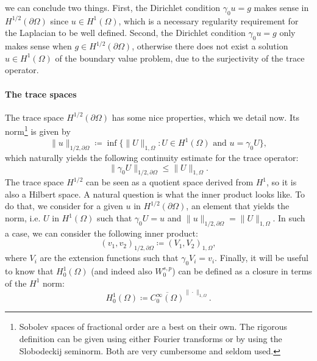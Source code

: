 we can conclude two things. First, the Dirichlet condition $\gamma_0 u = g$ makes sense in $H^{1/2}(\partial\Omega)$ since $u\in H^1(\Omega)$, which is a necessary regularity requirement for the Laplacian to be well defined. Second, the Dirichlet condition $\gamma_0 u = g$ only makes sense when $g\in H^{1/2}(\partial\Omega)$, otherwise there does not exist a solution $u\in H^1(\Omega)$ of the boundary value problem, due to the surjectivity of the trace operator. %
\paragraph{The trace spaces} The trace space $H^{1/2}(\partial\Omega)$ has some nice properties, which we detail now. Its norm\footnote{Sobolev spaces of fractional order are a best on their own. The rigorous definition can be given using either Fourier transforms or by using the Slobodeckij seminorm. Both are very cumbersome and seldom used.} is given by 
\begin{equation}\label{eq:norm-trace-1/2}
    \| u \|_{1/2,\partial\Omega} \coloneqq \inf\{\|U\|_{1,\Omega}: U \in H^1(\Omega) \text{ and } u = \gamma_0 U\},
\end{equation}
which naturally yields the following continuity estimate for the trace operator: 
\begin{equation}
    \| \gamma_0 U\|_{1/2,\partial\Omega} \leq \| U \|_{1,\Omega} .
\end{equation}
The trace space $H^{1/2}$ can be seen as a quotient space derived from $H^1$, so it is also a Hilbert space. A natural question is what the inner product looks like. To do that, we consider for a given $u$ in $H^{1/2}(\partial\Omega)$, an element that yields the norm, i.e. $U$ in $H^1(\Omega)$ such that $\gamma_0 U = u$ and $\| u \|_{1/2,\partial\Omega} = \| U \|_{1,\Omega}$. In such a case, we can consider the following inner product: 
\begin{equation}\label{eq:inner-product-trace-1/2}
    (v_1, v_2)_{1/2,\partial\Omega} \coloneqq (V_1, V_2)_{1,\Omega},
\end{equation}
where $V_i$ are the extension functions such that $\gamma_0 V_i = v_i$. Finally, it will be useful to know that $H_0^1(\Omega)$ (and indeed also $W_0^{s,p}$) can be defined as a closure in terms of the $H^1$ norm: 
\begin{equation}\label{eq:def-H01-closure}
    H_0^1(\Omega) \coloneqq \overline{C_0^\infty(\Omega)}^{\|\cdot \|_{1,\Omega}}.
\end{equation}

